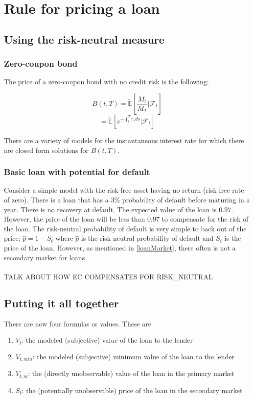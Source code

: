 \documentclass{article}
\theoremstyle{definition}
\begin{document}
\section{Rule for pricing a loan}

\subsection{Using the risk-neutral measure}

\subsubsection{Zero-coupon bond}
The price of a zero-coupon bond with no credit risk is the following:

\[B(t, T)=\mathbb{\tilde{E}}\left[\frac{M_t}{M_T}|\mathcal{F}_t\right]\]
\[=\mathbb{\tilde{E}}\left[e^{-\int_t ^ T r_s ds}|\mathcal{F}_t\right]\]

There are a variety of models for the instantaneous interest rate for which there are closed form solutions for \(B(t, T)\).  

\subsubsection{Basic loan with potential for default}
Consider a simple model with the risk-free asset having no return (risk free rate of zero). There is a loan that has a \(3\%\) probability of default before maturing in a year.  There is no recovery at default.  The expected value of the loan is \(0.97\).  However, the price of the loan will be less than \(0.97\) to compensate for the risk of the loan.  The risk-neutral probability of default is very simple to back out of the price: \(\hat{p}=1-S_t\) where \(\hat{p}\) is the risk-neutral probability of default and \(S_t\) is the price of the loan.  However, as mentioned in \ref{loanMarket}, there often is not a secondary market for loans.  
\\
\\
TALK ABOUT HOW EC COMPENSATES FOR RISK_NEUTRAL

\subsection{Putting it all together}


There are now four formulas or values.  These are

\begin{enumerate}
	\item \(V_t\): the modeled (subjective) value of the loan to the lender
	\item \(V_{t, min}\): the modeled (subjective) minimum value of the loan to the lender
	\item \(V_{t, m}\): the (directly unobservable) value of the loan in the primary market
	\item \(S_t\): the (potentially unobservable) price of the loan in the secondary market
	
\end{enumerate}
\end{document}

